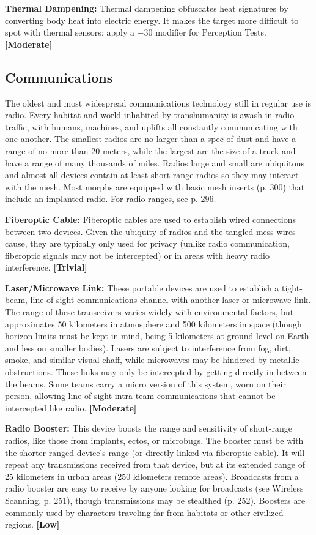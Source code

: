 \textbf{Thermal Dampening:} Thermal dampening obfuscates heat signatures by converting body heat into electric energy. It makes the target more difficult to spot with thermal sensors; apply a $-$30 modifier for Perception Tests. \textbf{[Moderate]} 

\subsection{Communications} \label{sec:communications} 

The oldest and most widespread communications technology still in regular use is radio. Every habitat and world inhabited by transhumanity is awash in radio traffic, with humans, machines, and uplifts all constantly communicating with one another. The smallest radios are no larger than a spec of dust and have a range of no more than 20 meters, while the largest are the size of a truck and have a range of many thousands of miles. Radios large and small are ubiquitous and almost all devices contain at least short-range radios so they may interact with the mesh. Most morphs are equipped with basic mesh inserts (p. 300) that include an implanted radio. For radio ranges, see p. 296. 

\textbf{Fiberoptic Cable:} Fiberoptic cables are used to establish wired connections between two devices. Given the ubiquity of radios and the tangled mess wires cause, they are typically only used for privacy (unlike radio communication, fiberoptic signals may not be intercepted) or in areas with heavy radio interference. \textbf{[Trivial]} 

\textbf{Laser/Microwave Link:} These portable devices are used to establish a tight-beam, line-of-sight communications channel with another laser or microwave link. The range of these transceivers varies widely with environmental factors, but approximates 50 kilometers in atmosphere and 500 kilometers in space (though horizon limits must be kept in mind, being 5 kilometers at ground level on Earth and less on smaller bodies). Lasers are subject to interference from fog, dirt, smoke, and similar visual chaff, while microwaves may be hindered by metallic obstructions. These links may only be intercepted by getting directly in between the beams. Some teams carry a micro version of this system, worn on their person, allowing line of sight intra-team communications that cannot be intercepted like radio. \textbf{[Moderate]} 

\textbf{Radio Booster:} This device boosts the range and sensitivity of short-range radios, like those from implants, ectos, or microbugs. The booster must be with the shorter-ranged device’s range (or directly linked via fiberoptic cable). It will repeat any transmissions received from that device, but at its extended range of 25 kilometers in urban areas (250 kilometers remote areas). Broadcasts from a radio booster are easy to receive by anyone looking for broadcasts (see Wireless Scanning, p. 251), though transmissions may be stealthed (p. 252). Boosters are commonly used by characters traveling far from habitats or other civilized regions. \textbf{[Low]} 



